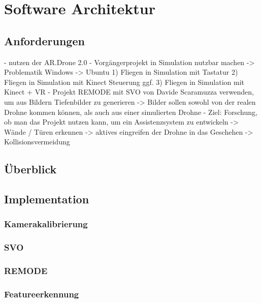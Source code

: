 
\chapter{Software Architektur}
\section{Anforderungen}
\label{sec:Anforderungen} 
- nutzen der AR.Drone 2.0
- Vorgängerprojekt in Simulation nutzbar machen
 -> Problematik Windows -> Ubuntu
 1) Fliegen in Simulation mit Tastatur 
 2) Fliegen in Simulation mit Kinect Steuerung
 ggf. 3) Fliegen in Simulation mit Kinect + VR
- Projekt REMODE mit SVO von Davide Scaramuzza verwenden, um aus Bildern Tiefenbilder zu generieren
-> Bilder sollen sowohl von der realen Drohne kommen können, als auch aus einer simulierten Drohne
- Ziel: Forschung, ob man das Projekt nutzen kann, um ein Assistenzsystem zu entwickeln
	-> Wände / Türen erkennen
	-> aktives eingreifen der Drohne in das Geschehen -> Kollisionsvermeidung
	


\section{Überblick}
\label{Überblick}

\section{Implementation}
\label{Implementation}

\newpage
\subsection{Kamerakalibrierung}
\subsection{SVO}
\subsection{REMODE}
\subsection{Featureerkennung}



